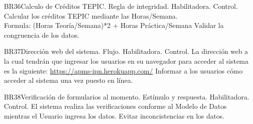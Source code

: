  \begin{BussinesRule}{BR36}{Calculo de Créditos TEPIC.}
     \BRitem[Tipo:] Regla de integridad.
     \BRitem[Clase:] Habilitadora.
     \BRitem[Nivel:] Control.
     \BRitem[Descripción:]Calcular los créditos TEPIC mediante las Horas/Semana.\\
     Formula: (Horas Teoría/Semana)*2 + Horas Práctica/Semana
     \BRitem[Motivación:] Validar la congruencia de los datos.
  \end{BussinesRule}
   \begin{BussinesRule}{BR37}{Dirección web del sistema.}
     \BRitem[Tipo:] Flujo.
     \BRitem[Clase:] Habilitadora.
     \BRitem[Nivel:] Control.
     \BRitem[Descripción:] La dirección web a la cual tendrán que ingresar los usuarios en su navegador para acceder al sistema es la siguiente: \url{https://apms-ipn.herokuapp.com/}
     \BRitem[Motivación:] Informar a los usuarios cómo acceder al sistema una vez puesto en línea.
  \end{BussinesRule}
   \begin{BussinesRule}{BR38}{Verificación de formularios al momento.}
     \BRitem[Tipo:]  Estímulo y respuesta.
     \BRitem[Clase:] Habilitadora.
     \BRitem[Nivel:] Control.
     \BRitem[Descripción:] El sistema realiza las verificaciones conforme al Modelo de Datos mientras el Usuario ingresa los datos.
     \BRitem[Motivación:] Evitar inconcistencias en los datos.
  \end{BussinesRule}
